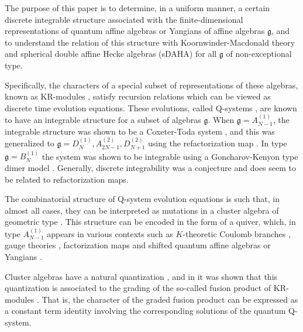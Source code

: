 \documentclass[12pt]{amsart}
\newcommand{\g}{{\mathfrak{g}}}
\numberwithin{equation}{section}
\begin{document}
The purpose of this paper is to determine, in a uniform manner,  a certain discrete integrable structure associated with the finite-dimensional representations of quantum affine algebras or Yangians of affine algebras $\g$, and to understand the relation of this structure with Koornwinder-Macdonald theory and  spherical double affine Hecke algebras (sDAHA) for all $\g$ of non-exceptional type. 

Specifically, the characters of a special subset of representations of these algebras, known as KR-modules \cite{ChariMoura,KR}, satisfy recursion relations which can be viewed as discrete time evolution equations. These  evolutions, called Q-systems \cite{HKOTY,HKOTT}, are known to have an integrable structure for a subset of algebras $\g$. When $\g=A_{N-1}^{(1)}$, 
the integrable structure was shown to be a Coxeter-Toda system \cite{DFK10,GSVct}, and this was generalized  \cite{Williams} to $\g=D_N^{(1)}, A_{2N-1}^{(2)}, D_{N+1}^{(2)}$ using the refactorization map \cite{HKKR}. In type $\g=B_N^{(1)}$ the system was shown to be integrable \cite{Panu} using a Goncharov-Kenyon type dimer model \cite{GoncharovKenyon}. Generally, discrete integrability was a conjecture and does seem to be related to refactorization maps.
%
%

The combinatorial structure of Q-system evolution equations is such that, in almost all cases, they can be interpreted as mutations in a cluster algebra of geometric type \cite{clusK,clusDFK}. This  structure can be encoded in the form of  a quiver, which, in type $A_{N-1}^{(1)}$ appears in various contexts such as $K$-theoretic Coulomb branches \cite{SS19}, gauge theories \cite{CNV}, factorization maps \cite{Williams} and shifted quantum affine algebras or Yangians \cite{BFN,FTshiftedquantum,DFKqt}.

Cluster algebras have a natural quantization \cite{BZ}, and in \cite{krKR,Simon} it was shown that this quantization is associated to the grading of the so-called fusion product of KR-modules  \cite{FL}. That is, the character of the graded fusion product can be expressed as a constant term identity involving the corresponding solutions of the quantum Q-system.

%
%
\end{document}
